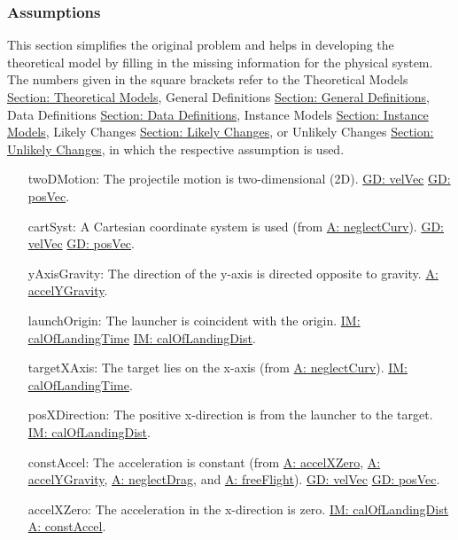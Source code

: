 \documentclass[12pt]{article}
\begin{document}
\subsubsection{Assumptions}
\label{Sec:Assumps}
This section simplifies the original problem and helps in developing the theoretical model by filling in the missing information for the physical system. The numbers given in the square brackets refer to the Theoretical Models \hyperref[Sec:TMs]{Section: Theoretical Models}, General Definitions \hyperref[Sec:GDs]{Section: General Definitions}, Data Definitions \hyperref[Sec:DDs]{Section: Data Definitions}, Instance Models \hyperref[Sec:IMs]{Section: Instance Models}, Likely Changes \hyperref[Sec:LCs]{Section: Likely Changes}, or Unlikely Changes \hyperref[Sec:UCs]{Section: Unlikely Changes}, in which the respective assumption is used.
\begin{itemize}
\item[twoDMotion:\phantomsection\label{twoDMotion}]The projectile motion is two-dimensional (2D). \hyperref[GD:velVec]{GD: velVec} \hyperref[GD:posVec]{GD: posVec}.
\item[cartSyst:\phantomsection\label{cartSyst}]A Cartesian coordinate system is used (from \hyperref[neglectCurv]{A: neglectCurv}). \hyperref[GD:velVec]{GD: velVec} \hyperref[GD:posVec]{GD: posVec}.
\item[yAxisGravity:\phantomsection\label{yAxisGravity}]The direction of the y-axis is directed opposite to gravity. \hyperref[accelYGravity]{A: accelYGravity}.
\item[launchOrigin:\phantomsection\label{launchOrigin}]The launcher is coincident with the origin. \hyperref[IM:calOfLandingTime]{IM: calOfLandingTime} \hyperref[IM:calOfLandingDist]{IM: calOfLandingDist}.
\item[targetXAxis:\phantomsection\label{targetXAxis}]The target lies on the x-axis (from \hyperref[neglectCurv]{A: neglectCurv}). \hyperref[IM:calOfLandingTime]{IM: calOfLandingTime}.
\item[posXDirection:\phantomsection\label{posXDirection}]The positive x-direction is from the launcher to the target. \hyperref[IM:calOfLandingDist]{IM: calOfLandingDist}.
\item[constAccel:\phantomsection\label{constAccel}]The acceleration is constant (from \hyperref[accelXZero]{A: accelXZero}, \hyperref[accelYGravity]{A: accelYGravity}, \hyperref[neglectDrag]{A: neglectDrag}, and \hyperref[freeFlight]{A: freeFlight}). \hyperref[GD:velVec]{GD: velVec} \hyperref[GD:posVec]{GD: posVec}.
\item[accelXZero:\phantomsection\label{accelXZero}]The acceleration in the x-direction is zero. \hyperref[IM:calOfLandingDist]{IM: calOfLandingDist} \hyperref[constAccel]{A: constAccel}.

\end{itemize}
\end{document}
